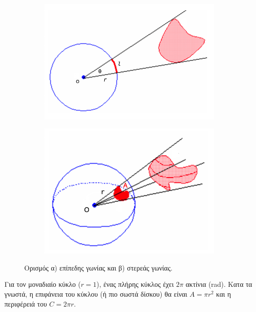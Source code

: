 \begin{figure}[h]
   \centering
\begin{subfigure}[h]{0.45\textwidth}
	\centering
   	 \includegraphics[scale=0.3]{Figures/plane_angle_def.png} 
\end{subfigure}
\begin{subfigure}[h]{0.5\textwidth}
	\centering
	\includegraphics[scale=0.3]{Figures/solid_angle_def.png} 
    \end{subfigure}
    \caption{Ορισμός α) επίπεδης γωνίας και β) στερεάς γωνίας.}
    \label{fig:plane_and_solid_angle}
\end{figure}


Για τον μοναδιαίο κύκλο ($r=1$), ένας πλήρης κύκλος έχει $2\pi$ ακτίνια (rad). Κατα τα γνωστά, η επιφάνεια του κύκλου (ή πιο σωστά δίσκου) θα είναι $A = \pi r^2$ και η περιφέρειά του $C = 2 \pi r$.

